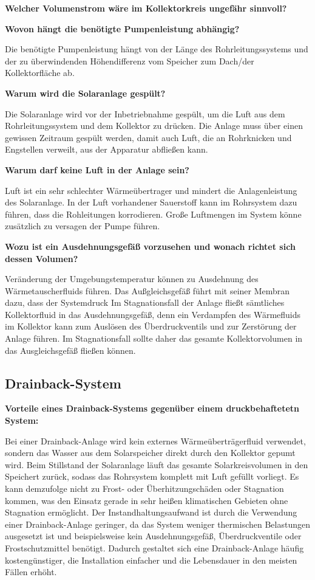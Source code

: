 \textbf{Welcher Volumenstrom wäre im Kollektorkreis ungefähr sinnvoll?}

\textbf{Wovon hängt die benötigte Pumpenleistung abhängig?}

Die benötigte Pumpenleistung hängt von der Länge des Rohrleitungssystems und der zu überwindenden Höhendifferenz vom Speicher zum Dach/der Kollektorfläche ab. 

\textbf{Warum wird die Solaranlage gespült?}

Die Solaranlage wird vor der Inbetriebnahme gespült, um die Luft aus dem Rohrleitungssystem und dem Kollektor zu drücken. Die Anlage muss über einen gewissen Zeitraum gespült werden, damit auch Luft, die an Rohrknicken und Engstellen verweilt, aus der Apparatur abfließen kann.

\textbf{Warum darf keine Luft in der Anlage sein?}

Luft ist ein sehr schlechter Wärmeübertrager und mindert die Anlagenleistung des Solaranlage. In der Luft vorhandener Sauerstoff kann im Rohrsystem dazu führen, dass die Rohleitungen korrodieren. Große Luftmengen im System könne zusätzlich zu versagen der Pumpe führen. 

\textbf{Wozu ist ein Ausdehnungsgefäß vorzusehen und wonach richtet sich dessen Volumen?}

Veränderung der Umgebungstemperatur können zu Ausdehnung des Wärmetauscherfluids führen. Das Außgleichsgefäß führt mit seiner Membran dazu, dass der Systemdruck Im Stagnationsfall der Anlage fließt sämtliches Kollektorfluid in das Ausdehnungsgefäß, denn ein Verdampfen des Wärmefluids im Kollektor kann zum Auslösen des Überdruckventils und zur Zerstörung der Anlage führen. Im Stagnationsfall sollte daher das gesamte Kollektorvolumen in das Ausgleichsgefäß fließen können.

\subsection{Drainback-System}

\textbf{Vorteile eines Drainback-Systems gegenüber einem druckbehaftetetn System:}

Bei einer Drainback-Anlage wird kein externes Wärmeüberträgerfluid verwendet, sondern das Wasser aus dem Solarspeicher direkt durch den Kollektor gepumt wird. Beim Stillstand der Solaranlage läuft das gesamte Solarkreisvolumen in den Speichert zurück, sodass das Rohrsystem  komplett mit Luft gefüllt vorliegt. Es kann demzufolge nicht zu Frost- oder Überhitzungschäden oder Stagnation kommen, was den Einsatz gerade in sehr heißen klimatischen Gebieten ohne Stagnation ermöglicht. Der Instandhaltungsaufwand ist durch die Verwendung einer Drainback-Anlage geringer, da das System weniger thermischen Belastungen ausgesetzt ist und beispielsweise kein Ausdehnungsgefäß, Überdruckventile oder Frostschutzmittel benötigt. Dadurch gestaltet sich eine Drainback-Anlage häufig kostengünstiger, die Installation einfacher und die Lebensdauer in den meisten Fällen erhöht. \\

